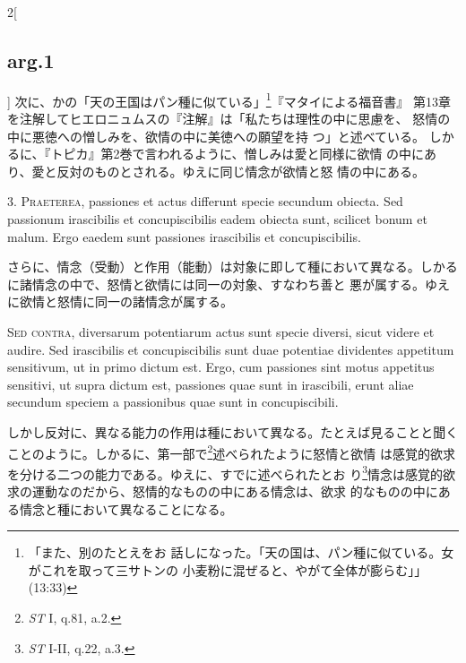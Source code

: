 \documentclass[paper=a4paper,fontsize=10pt,jafontsize=9pt,titlepage]{jlreq}
\begin{document}
\begin{paracol}{2}[\subsection{arg.1}]
次に、かの「天の王国はパン種に似ている」\footnote{「また、別のたとえをお
 話しになった。「天の国は、パン種に似ている。女がこれを取って三サトンの
 小麦粉に混ぜると、やがて全体が膨らむ」」(13:33)}『マタイによる福音書』
 第13章を注解してヒエロニュムスの『注解』は「私たちは理性の中に思慮を、
 怒情の中に悪徳への憎しみを、欲情の中に美徳への願望を持
 つ」と述べている。
しかるに、『トピカ』第2巻で言われるように、憎しみは愛と同様に欲情
の中にあり、愛と反対のものとされる。ゆえに同じ情念が欲情と怒
 情の中にある。


3. {\scshape Praeterea}, passiones et actus differunt specie secundum obiecta. Sed
passionum irascibilis et concupiscibilis eadem obiecta sunt, scilicet
bonum et malum. Ergo eaedem sunt passiones irascibilis et
concupiscibilis.

\switchcolumn

さらに、情念（受動）と作用（能動）は対象に即して種において異なる。しかる
 に諸情念の中で、怒情と欲情には同一の対象、すなわち善と
 悪が属する。ゆえに欲情と怒情に同一の諸情念が属する。

\switchcolumn*[\subsection{s.c.}]

{\scshape Sed contra}, diversarum potentiarum actus sunt specie diversi, sicut
videre et audire. Sed irascibilis et concupiscibilis sunt duae potentiae
dividentes appetitum sensitivum, ut in primo dictum est. Ergo, cum
passiones sint motus appetitus sensitivi, ut supra dictum est, passiones
quae sunt in irascibili, erunt aliae secundum speciem a passionibus quae
sunt in concupiscibili.

\switchcolumn

しかし反対に、異なる能力の作用は種において異なる。たとえば見ることと聞く
 ことのように。しかるに、第一部で\footnote{{\itshape ST} I, q.81, a.2.}述べられたように怒情と欲情
は感覚的欲求を分ける二つの能力である。ゆえに、すでに述べられたとお
 り\footnote{{\itshape ST} I-II, q.22, a.3.}情念は感覚的欲求の運動なのだから、怒情的なものの中にある情念は、欲求
 的なものの中にある情念と種において異なることになる。



\end{paracol}
\end{document}
